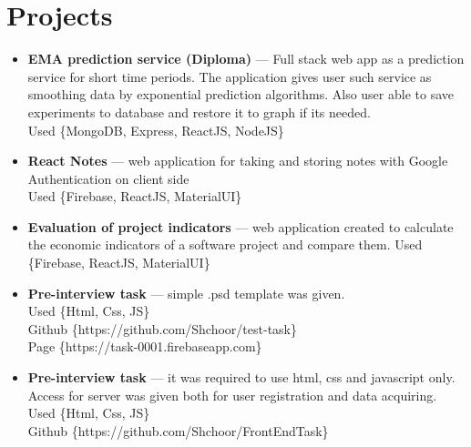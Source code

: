 \documentclass[a4paper]{article}
\begin{document}
	\section*{Projects}
	\begin{itemize}
		\item {\textbf{EMA prediction service (Diploma)}}  --- Full stack web app as a prediction service for short time periods. The application gives user 			such service as smoothing data by exponential prediction algorithms. Also user able to save experiments to database and restore it to graph if its 			needed.\\[0.2em]
		{\footnotesize Used \{MongoDB, Express, ReactJS, NodeJS\}} \\[0.2em]

		\item {\textbf{React Notes}} --- web application for taking and storing notes with Google
Authentication on client side \\[0.2em]
		{\footnotesize Used \{Firebase, ReactJS, MaterialUI\}} \\[0.2em]

		\item{\textbf{Evaluation of project indicators}} --- web application created to calculate
the economic indicators of a software project and compare them.
		{\footnotesize Used \{Firebase, ReactJS, MaterialUI\}} \\[0.2em]
		
		\item{\textbf{Pre-interview task }} --- simple .psd template was given. \\[0.2em]
		{\footnotesize Used \{Html, Css, JS\}} \\[0.2em]
		{\footnotesize Github \{https://github.com/Shchoor/test-task\}} \\[0.2em]
		{\footnotesize Page \{https://task-0001.firebaseapp.com\}} \\[0.2em]

		\item{\textbf{Pre-interview task }} --- it was required to use html, css and javascript only. Access for server was given both for user  registration  and data acquiring. \\[0.2em]
		{\footnotesize Used \{Html, Css, JS\}} \\[0.2em]
		{\footnotesize Github \{https://github.com/Shchoor/FrontEndTask\}} \\[0.2em]
		

	\end{itemize}
\end{document}
